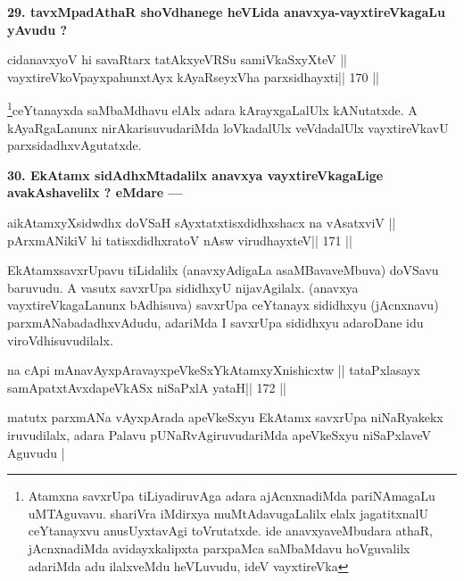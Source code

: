 \begin{artha}
{\bf 29. tavxMpadAthaR shoVdhanege heVLida anavxya-vayxtireVkagaLu yAvudu ?}
\end{artha}

\begin{shl}
cidanavxyoV hi savaRtarx tatAkxyeVRSu samiVkaSxyXteV ||
vayxtireVkoV\s payxpahunxtAyx kAyaRseyxVha parxsidhayxti\hfill || 170 ||
\end{shl}

\begin{artha}
\footnote[11]{Atamxna savxrUpa tiLiyadiruvAga adara ajAcnxnadiMda pariNAmagaLu uMTAguvavu. shariVra iMdirxya muMtAdavugaLalilx elalx jagatitxnalU ceYtanayxvu anusUyxtavAgi toVrutatxde. ide anavxyaveMbudara athaR, jAcnxnadiMda avidayxkalipxta parxpaMca saMbaMdavu hoVguvalilx adariMda adu ilalxveMdu heVLuvudu, ideV vayxtireVka}ceYtanayxda saMbaMdhavu elAlx adara kArayxgaLalUlx kANutatxde. A kAyaRgaLanunx nirAkarisuvudariMda loVkadalUlx veVdadalUlx vayxtireVkavU parxsidadhxvAgutatxde.
\end{artha}

\begin{artha}
{\bf 30. EkAtamx sidAdhxMtadalilx anavxya vayxtireVkagaLige avakAshavelilx ? eMdare ---}
\end{artha}

\begin{shl}
aikAtamxyXsidwdhx doVSaH sAyxtatxtisxdidhxshacx na vAsatxviV ||
pArxmANikiV hi tatisxdidhxratoV nAsw virudhayxteV\hfill || 171 ||
\end{shl}

\begin{artha}
EkAtamxsavxrUpavu tiLidalilx (anavxyAdigaLa asaMBavaveMbuva) doVSavu baruvudu. A vasutx savxrUpa sididhxyU nijavAgilalx. (anavxya vayxtireVkagaLanunx bAdhisuva) savxrUpa ceYtanayx sididhxyu (jAcnxnavu) parxmANabadadhxvAdudu, adariMda I savxrUpa sididhxyu adaroDane idu viroVdhisuvudilalx.
\end{artha}

\begin{shl}
na cApi mAnavAyxpAravayxpeVkeSxYkAtamxyXnishicxtw ||
tataPxlasayx samApatxtAvxdapeVkASx niSaPxlA yataH\hfill || 172 ||
\end{shl}

\begin{artha}
matutx parxmANa vAyxpArada apeVkeSxyu EkAtamx savxrUpa niNaRyakekx iruvudilalx, adara Palavu pUNaRvAgiruvudariMda apeVkeSxyu niSaPxlaveV Aguvudu |
\end{artha}

